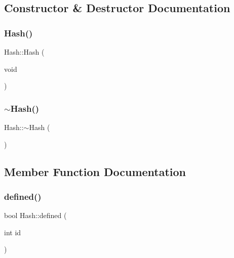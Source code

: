 \subsection{Constructor \& Destructor Documentation}
\mbox{\label{classHash_a73664aa35c78765aff5ef005db70d245}} 
\subsubsection{\texorpdfstring{Hash()}{Hash()}}
{\footnotesize\ttfamily Hash\+::\+Hash (\begin{DoxyParamCaption}\item[{void}]{ }\end{DoxyParamCaption})}

\mbox{\label{classHash_a4e4b4797dda8678aaed058bae155813e}} 
\subsubsection{\texorpdfstring{$\sim$\+Hash()}{~Hash()}}
{\footnotesize\ttfamily Hash\+::$\sim$\+Hash (\begin{DoxyParamCaption}{ }\end{DoxyParamCaption})}



\subsection{Member Function Documentation}
\mbox{\label{classHash_a90db160a10f8005570e89b3eba1fe26b}} 
\subsubsection{\texorpdfstring{defined()}{defined()}}
{\footnotesize\ttfamily bool Hash\+::defined (\begin{DoxyParamCaption}\item[{int}]{id }\end{DoxyParamCaption})}

\mbox{\label{classHash_af7a8ac0f6edd46bf065f70e077ca4b48}} 
